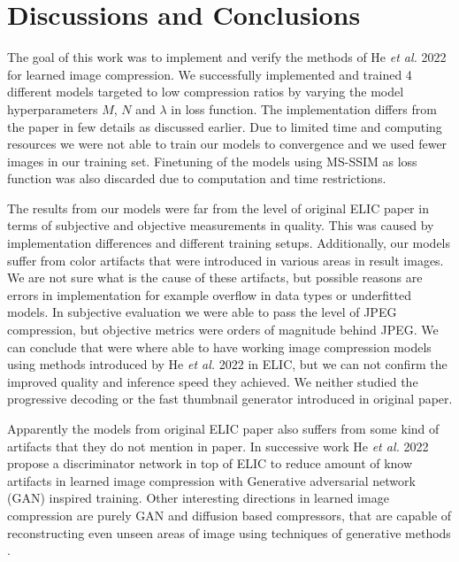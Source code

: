 \documentclass{article}
\begin{document}
\vfill\pagebreak
\vfill\pagebreak


\section{Discussions and Conclusions}
The goal of this work was to implement and verify the methods of He \textit{et al.} 2022 \cite{ELIC} for learned image compression. We successfully implemented and trained 4 different models targeted to low compression ratios by varying the model hyperparameters $M$, $N$ and $\lambda$ in loss function. The implementation differs from the paper in few details as discussed earlier. Due to limited time and computing resources we were not able to train our models to convergence and we used fewer images in our training set. Finetuning of the models using MS-SSIM as loss function was also discarded due to computation and time restrictions. 

The results from our models were far from the level of original ELIC paper in terms of subjective and objective measurements in quality. This was caused by implementation differences and different training setups. Additionally, our models suffer from color artifacts that were introduced in various areas in result images. We are not sure what is the cause of these artifacts, but possible reasons are errors in implementation for example overflow in data types or underfitted models. In subjective evaluation we were able to pass the level of JPEG compression, but objective metrics were orders of magnitude behind JPEG. We can conclude that were where able to have working image compression models using methods introduced by He \textit{et al.} 2022 \cite{ELIC} in ELIC, but we can not confirm the improved quality and inference speed they achieved. We neither studied the progressive decoding or the fast thumbnail generator introduced in original paper. 

Apparently the models from original ELIC paper also suffers from some kind of artifacts that they do not mention in paper. In successive work He \textit{et al.} 2022 \cite{PO-ELIC} propose a discriminator network in top of ELIC to reduce amount of know artifacts in learned image compression with Generative adversarial network (GAN) inspired training. Other interesting directions in learned image compression are purely GAN and diffusion based compressors, that are capable of reconstructing even unseen areas of image using techniques of generative methods \cite{HIFIC, diffusion}. 





\end{document}

